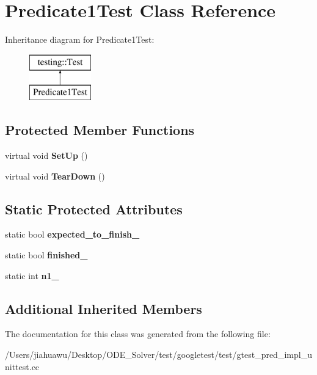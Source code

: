 \hypertarget{class_predicate1_test}{}\section{Predicate1\+Test Class Reference}
\label{class_predicate1_test}
Inheritance diagram for Predicate1\+Test\+:\begin{figure}[H]
\begin{center}
\leavevmode
\includegraphics[height=2.000000cm]{class_predicate1_test}
\end{center}
\end{figure}
\subsection*{Protected Member Functions}
\begin{DoxyCompactItemize}
\item 
\mbox{\label{class_predicate1_test_a481704a09f73a37158513f9a336dbdd9}} 
virtual void {\bfseries Set\+Up} ()
\item 
\mbox{\label{class_predicate1_test_ad2974af5c6abc508847c3a9912b24a90}} 
virtual void {\bfseries Tear\+Down} ()
\end{DoxyCompactItemize}
\subsection*{Static Protected Attributes}
\begin{DoxyCompactItemize}
\item 
\mbox{\label{class_predicate1_test_ad91cfa58e6352d53abacce32df2ef635}} 
static bool {\bfseries expected\+\_\+to\+\_\+finish\+\_\+}
\item 
\mbox{\label{class_predicate1_test_a6d45fb2d1f01a5c8baf28f60039c244e}} 
static bool {\bfseries finished\+\_\+}
\item 
\mbox{\label{class_predicate1_test_a528d9f7f618b17802962a3824eea11e3}} 
static int {\bfseries n1\+\_\+}
\end{DoxyCompactItemize}
\subsection*{Additional Inherited Members}


The documentation for this class was generated from the following file\+:\begin{DoxyCompactItemize}
\item 
/\+Users/jiahuawu/\+Desktop/\+O\+D\+E\+\_\+\+Solver/test/googletest/test/gtest\+\_\+pred\+\_\+impl\+\_\+unittest.\+cc\end{DoxyCompactItemize}
